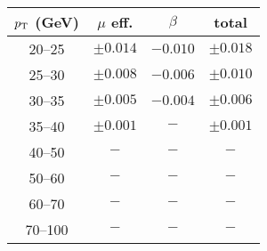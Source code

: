 \begin{tabular}{c|cc|c}
$p_\text{T}$ (GeV)  & $\mu$ eff. & $\beta$ & total \\
\hline
20--25 & $\pm0.014$ & $-0.010$ & $\pm0.018$\\
25--30 & $\pm0.008$ & $-0.006$ & $\pm0.010$\\
30--35 & $\pm0.005$ & $-0.004$ & $\pm0.006$\\
35--40 & $\pm0.001$ & $-$ & $\pm0.001$\\
40--50 & $-$ & $-$ & $-$\\
50--60 & $-$ & $-$ & $-$\\
60--70 & $-$ & $-$ & $-$\\
70--100 & $-$ & $-$ & $-$\\
\end{tabular}
